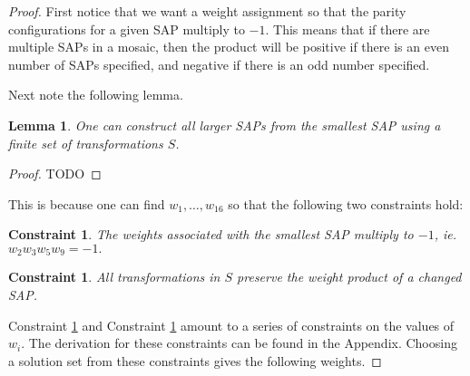 \documentclass[12pt]{article}
\theoremstyle{plain}
\newtheorem{lemma}[thm]{Lemma}
\newtheorem{constraint}[thm]{Constraint}
\theoremstyle{definition}
\theoremstyle{remark}
\theoremstyle{definition}
\begin{document}
\begin{proof}
First notice that we want a weight assignment so that the parity configurations for a given SAP multiply to $-1$. This means that if there are multiple SAPs in a mosaic, then the product will be positive if there is an even number of SAPs specified, and negative if there is an odd number specified.

Next note the following lemma.
\begin{lemma}
    \label{lemma: build bigger saps}
    One can construct all larger SAPs from the smallest SAP using a finite set of transformations $S$.
\end{lemma}

\begin{proof}
    TODO
\end{proof}

This is because one can find $w_{1} , \dots, w_{16}$ so that the following two constraints hold:

\begin{constraint}
    \label{constraint: smallest sap prod}
    The weights associated with the smallest SAP multiply to $-1$, ie. $w_2 w_3 w_5 w_9 = -1.$ 
\end{constraint}

\begin{constraint}
    \label{constraint: prod works}
    \emph{All} transformations in $S$ preserve the weight product of a changed SAP.
\end{constraint}

Constraint \ref{constraint: smallest sap prod} and Constraint \ref{constraint: prod works} amount to a series of constraints on the values of $w_i$. The derivation for these constraints can be found in the Appendix. Choosing a solution set from these constraints gives the following weights.


\end{proof}
\end{document}
